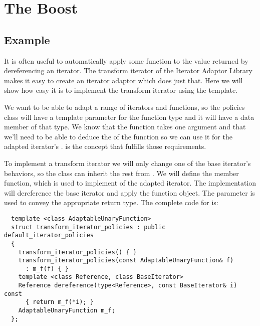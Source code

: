 \documentclass{netobjectdays}
\begin{document}


\section{The Boost }



\subsection{Example}

It is often useful to automatically apply some function to the value
returned by dereferencing an iterator. The transform iterator of the
Iterator Adaptor Library makes it easy to create an iterator adaptor
which does just that. Here we will show how easy it is to implement
the transform iterator using the
 template.

We want to be able to adapt a range of iterators and functions, so the
policies class will have a template parameter for the function type
and it will have a data member of that type. We know that the function
takes one argument and that we'll need to be able to deduce the
 of the function so we can use it for the adapted
iterator's .  is
the \textsf{concept}\cite{austern99:_gener_progr_stl} that fulfills
those requirements.

To implement a transform iterator we will only change one of the base
iterator's behaviors, so the 
class can inherit the rest from . We
will define the  member function, which is used
to implement  of the adapted iterator. The
implementation will dereference the base iterator and apply the
function object. The  parameter is used
to convey the appropriate return type. The complete code for
 is:

{\footnotesize
\begin{verbatim}
  template <class AdaptableUnaryFunction>
  struct transform_iterator_policies : public default_iterator_policies
  {
    transform_iterator_policies() { }
    transform_iterator_policies(const AdaptableUnaryFunction& f)
      : m_f(f) { }
    template <class Reference, class BaseIterator>
    Reference dereference(type<Reference>, const BaseIterator& i) const
      { return m_f(*i); }
    AdaptableUnaryFunction m_f;
  };
\end{verbatim}
}
\end{document}

